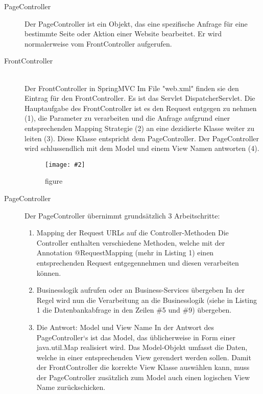 \documentclass[a4paper,10pt]{scrreprt}
\newcommand{\pic}[2][figure]{\begin{figure}[h]
 \centering
 \texttt{[image: \#2]}
 \caption{#1}
\end{figure}
}
\begin{document}
\begin{description}
 \item [PageController] Der PageController ist ein Objekt, das eine spezifische Anfrage für eine bestimmte Seite oder Aktion
einer Website bearbeitet. Er wird normalerweise vom FrontController aufgerufen.
\item [FrontController] \hfill \\
Der FrontController in SpringMVC
Im File "web.xml" finden sie den Eintrag für den FrontController. Es ist das Servlet
DispatcherServlet.
Die Hauptaufgabe des FrontController ist es den Request entgegen zu nehmen (1), die Parameter
zu verarbeiten und die Anfrage aufgrund einer entsprechenden Mapping Strategie (2) an eine
dezidierte Klasse weiter zu leiten (3). Diese Klasse entspricht dem PageController. Der
PageController wird schlussendlich mit dem Model und einem View Namen antworten (4).
\pic{fctrl.png}
\item[PageController] Der PageController übernimmt grundsätzlich 3
Arbeitschritte:\\
\begin{enumerate}
\item  Mapping der Request URLs auf die Controller-Methoden
Die Controller enthalten verschiedene Methoden, welche mit der Annotation @RequestMapping
(mehr in Listing 1) einen entsprechenden Request entgegennehmen und diesen verarbeiten können.
\item  Businesslogik aufrufen oder an Business-Services übergeben
In der Regel wird nun die Verarbeitung an die Businesslogik (siehe in Listing 1 die
Datenbankabfrage in den Zeilen \#5 und \#9) übergeben.
\item Die Antwort: Model und View Name
In der Antwort des PageController‘s ist das Model, das üblicherweise in Form einer
java.util.Map realisiert wird. Das Model-Objekt umfasst die Daten, welche in einer
entsprechenden View gerendert werden sollen. Damit der FrontController die korrekte View Klasse
auswählen kann, muss der PageController zusätzlich zum Model auch einen logischen View Name
zurückschicken.
\end{enumerate}

\end{description}
\end{document}
